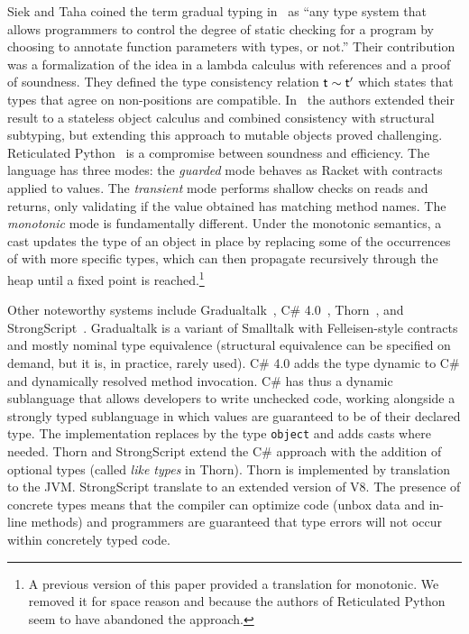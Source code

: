 \documentclass[runnningheads]{tex/llncs}
\begin{document}
Siek and Taha coined the term gradual typing in~\cite{SiekTaha06} as ``any
type system that allows programmers to control the degree of static checking
for a program by choosing to annotate function parameters with types, or
not.'' Their contribution was a formalization of the idea in a lambda
calculus with references and a proof of soundness. They defined the type
consistency relation $\t \sim \tp$ which states that types that agree on
non-\any positions are compatible.  In~\cite{SiekTaha07} the authors
extended their result to a stateless object calculus and combined
consistency with structural subtyping, but extending this approach to
mutable objects proved challenging.  Reticulated Python~\cite{siek14} is a
compromise between soundness and efficiency.  The language has three modes:
the \emph{guarded} mode behaves as Racket with contracts applied to values.
The \emph{transient} mode performs shallow checks on reads and returns, only
validating if the value obtained has matching method names.  The
\emph{monotonic} mode is fundamentally different. Under the monotonic
semantics, a cast updates the type of an object in place by replacing some
of the occurrences of \any with more specific types, which can then
propagate recursively through the heap until a fixed point is
reached.\footnote{A previous version of this paper provided a translation
  for monotonic. We removed it for space reason and because the authors
  of Reticulated Python seem to have abandoned the approach.}

Other noteworthy systems include Gradualtalk~\cite{GS13}, C\#
4.0~\cite{Bierman10}, Thorn~\cite{oopsla09}, and
StrongScript~\cite{ecoop15}. Gradualtalk is a variant of Smalltalk with
Felleisen-style contracts and mostly nominal type equivalence (structural
equivalence can be specified on demand, but it is, in practice, rarely
used). C\# 4.0 adds the type {\sf dynamic} to C\# and dynamically resolved
method invocation.  C\# has thus a dynamic sublanguage that allows
developers to write unchecked code, working alongside a strongly typed
sublanguage in which values are guaranteed to be of their declared type.
The implementation replaces \any by the type {\tt object} and adds casts
where needed.  Thorn and StrongScript extend the C\# approach with the
addition of optional types (called {\em like types} in Thorn).  Thorn is
implemented by translation to the JVM. StrongScript translate to an extended
version of V8. The presence of concrete types means that the compiler can
optimize code (unbox data and in-line methods) and programmers are
guaranteed that type errors will not occur within concretely typed code.
\end{document}

